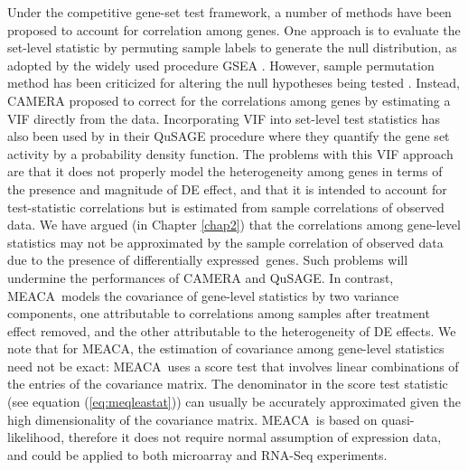 \documentclass[a4,center,fleqn]{NAR}
\newcommand{\OurMethod}{MEACA}
\newcommand{\DED}{differentially expressed}
\begin{document}
	 Under the competitive gene-set test framework, a number of methods have been
	 proposed to account for correlation among genes. One approach is to evaluate the set-level 
	 statistic by permuting sample labels to generate the null distribution, as adopted by the 
	 widely used procedure GSEA \citep{subramanian2005gene}. However, sample permutation method has 
	 been criticized for altering the null hypotheses being tested 
	 \citep{goeman2007analyzing,khatri2012ten}. Instead, CAMERA \citep{wu2012camera} proposed to 
	 correct for the correlations among genes by estimating a VIF directly from the data. 
	 Incorporating VIF into set-level test statistics has also been used by 
	 \citet{yaari2013quantitative} in their QuSAGE procedure where 
	 they quantify the gene	 set activity by a probability density function. The 
	 problems with this VIF approach are that it does not properly model the heterogeneity among 
	 genes in terms of the presence and magnitude of DE effect, and that it is intended to account 
	 for test-statistic correlations but is estimated from sample correlations of observed data. We 
	 have argued (in Chapter \ref{chap2}) that the correlations among gene-level statistics may not 
	 be approximated by the sample correlation of observed data due to the presence of \DED~genes. 
	 Such problems will undermine the performances of CAMERA and QuSAGE. In contrast, 
	 \OurMethod~models the covariance of gene-level statistics by two variance components, one 
	 attributable to correlations among samples after treatment effect 
	 removed, and the other attributable to the heterogeneity of DE effects. We note that for	
	 \OurMethod, the estimation of covariance among gene-level statistics need not be exact:
	 \OurMethod~uses a score test that involves linear combinations of the entries of the covariance
	 matrix. The denominator in the score test statistic (see equation (\ref{eq:meqleastat})) can 
	 usually be accurately approximated given the high dimensionality of the covariance matrix. 
	 \OurMethod~is based on quasi-likelihood, therefore it does not require normal assumption of 
	 expression data, and could be applied to both microarray and RNA-Seq experiments. 
	 
\end{document}

